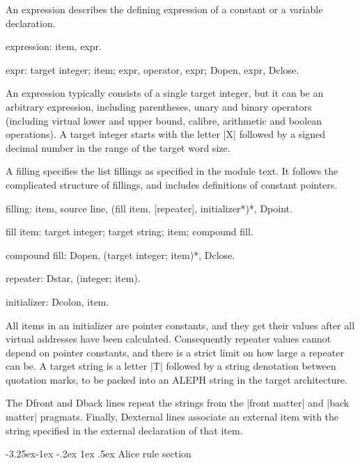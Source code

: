 \documentclass[titlepage]{article}
\makeatletter
\newcommand\A{\textsf{ALEPH}}
\newenvironment{grammar}{%
\begin{list}{}{%
\setlength\leftmargin{18pt}%
\setlength\rightmargin{-5pt}%
\setlength\listparindent{20pt}%
\setlength\itemsep{1pt plus0.2ex}%
\setlength\parsep{0pt plus 2pt}%
\setlength\labelsep{-5pt}%
}\color{blue!90!black}\sf\mkoptions%
}{\end{list}}
\newcommand\g[1]{\textsf{\color{blue!90!black}#1}}
\renewcommand\subsection{%
\@startsection{subsection}{2}{\z@}%
   {-3.25ex\@plus -1ex \@minus -.2ex}%
   {1ex \@plus .5ex}%
   {\normalfont\normalsize\bfseries}}
\makeatother
\begin{document}
\smallskip

An \g{expression} describes the defining expression of a \g{constant} or a
\g{variable} declaration.
\begin{grammar}
\item expression: item, expr.
\item expr: target integer; item; expr, operator, expr; Dopen, expr, Dclose.
\end{grammar}
An \g{expression} typically consists of a single target integer, but it can be
an arbitrary expression, including parentheses, unary and binary operators
(including virtual lower and upper bound, calibre, arithmetic and boolean
operations). A \g{target integer} starts with the letter \pp|X| followed by
a signed decimal number in the range of the target word size.

\smallskip

A \g{filling} specifies the list fillings as specified in the module text. It 
follows the complicated structure of fillings, and includes definitions of
constant pointers.
\begin{grammar}
\item filling: item, source line, (fill item, [repeater], 
initializer*)*, Dpoint.
\item fill item: target integer; target string; item; compound fill.
\item compound fill: Dopen, (target integer; item)*, Dclose.
\item repeater: Dstar, (integer; item).
\item initializer: Dcolon, item. 
\end{grammar}
All \g{item}s in an \g{initializer} are pointer constants, and they get
their values after all virtual addresses have been calculated. Consequently repeater
values cannot depend on pointer constants, and there is a strict limit on
how large a repeater can be. A \g{target string} is a letter \pp|T| followed
by a string denotation between quotation marks, to be packed into an \A{} string
in the target architecture.

\smallskip

The \g{Dfront} and \g{Dback} lines repeat the strings from the
\pp|front matter| and \pp|back matter| pragmats. Finally, \g{Dexternal} lines
associate an external item with the string specified in the external declaration 
of that item.

\subsection{Alice rule section}
\end{document}
